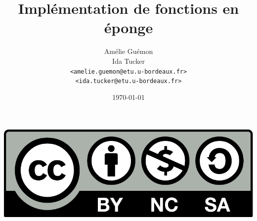 %
%

\usepackage[french]{babel}
\usepackage{tikz}
\usetikzlibrary{shapes}
\usetikzlibrary{positioning}
\usepackage{color}
\usepackage{amsmath, amsthm, amscd, amssymb, amsfonts, amsxtra}
\usepackage{stmaryrd}

\def\tikzoverlay{
   \tikz[remember picture, overlay]\node[every overlay node]
}

\newcommand{\highlight}[1]{\textcolor{structure.fg}{\bfseries #1}}

\title{Implémentation de fonctions en éponge}

\author[Amélie Guémon \& Ida Tucker]{Amélie Guémon\\Ida Tucker\\[.25em]
\texttt{\scriptsize <amelie.guemon@etu.u-bordeaux.fr>}\\[-.25em]
\texttt{\scriptsize <ida.tucker@etu.u-bordeaux.fr>}\\}


\date{\today}



\begin{frame}
  \vspace{3.5em}
  \titlepage

  \begin{center}
    \includegraphics[scale=.2]{cc-by-nc-sa.pdf}
  \end{center}
\end{frame}

